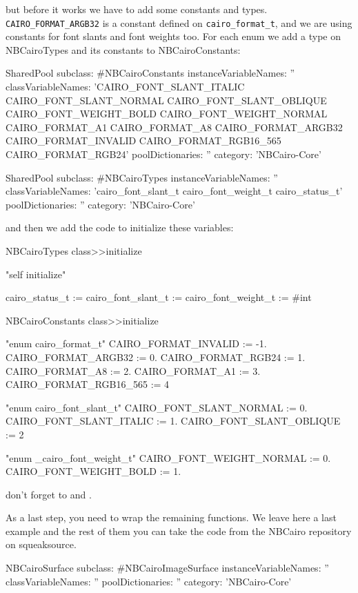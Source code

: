 \documentclass[a4paper,10pt,twoside]{book}
\begin{document}
but before it works we have to add some constants and types.
\verb|CAIRO_FORMAT_ARGB32| is a constant defined on
\verb|cairo_format_t|, and we are using constants for
font slants and font weights too. For each enum we add
a type on NBCairoTypes and its constants to NBCairoConstants:

\begin{code}
SharedPool subclass: #NBCairoConstants
	instanceVariableNames: ''
	classVariableNames: 'CAIRO_FONT_SLANT_ITALIC CAIRO_FONT_SLANT_NORMAL CAIRO_FONT_SLANT_OBLIQUE CAIRO_FONT_WEIGHT_BOLD CAIRO_FONT_WEIGHT_NORMAL CAIRO_FORMAT_A1 CAIRO_FORMAT_A8 CAIRO_FORMAT_ARGB32 CAIRO_FORMAT_INVALID CAIRO_FORMAT_RGB16_565 CAIRO_FORMAT_RGB24'
	poolDictionaries: ''
	category: 'NBCairo-Core'

SharedPool subclass: #NBCairoTypes
	instanceVariableNames: ''
	classVariableNames: 'cairo_font_slant_t cairo_font_weight_t cairo_status_t'
	poolDictionaries: ''
	category: 'NBCairo-Core'
\end{code}

and then we add the code to initialize these variables:

\begin{code}{}
NBCairoTypes class>>initialize

	"self initialize"
		
	cairo_status_t := cairo_font_slant_t := cairo_font_weight_t := #int


NBCairoConstants class>>initialize

	"enum cairo_format_t"
	CAIRO_FORMAT_INVALID :=  -1.
	CAIRO_FORMAT_ARGB32 :=  0.
	CAIRO_FORMAT_RGB24 := 1.
	CAIRO_FORMAT_A8 := 2.
	CAIRO_FORMAT_A1 := 3.
	CAIRO_FORMAT_RGB16_565 := 4
	
	"enum cairo_font_slant_t"
    CAIRO_FONT_SLANT_NORMAL := 0.
    CAIRO_FONT_SLANT_ITALIC := 1.
    CAIRO_FONT_SLANT_OBLIQUE := 2
    
	"enum _cairo_font_weight_t"
    CAIRO_FONT_WEIGHT_NORMAL := 0.
    CAIRO_FONT_WEIGHT_BOLD := 1.
\end{code}

don't forget to 
and .

As a last step, you need to wrap the remaining functions.
We leave here a last example and the rest of them you can
take the code from the NBCairo repository on squeaksource.

\begin{classdef}{}
NBCairoSurface subclass: #NBCairoImageSurface
	instanceVariableNames: ''
	classVariableNames: ''
	poolDictionaries: ''
	category: 'NBCairo-Core'
\end{classdef}
\end{document}
